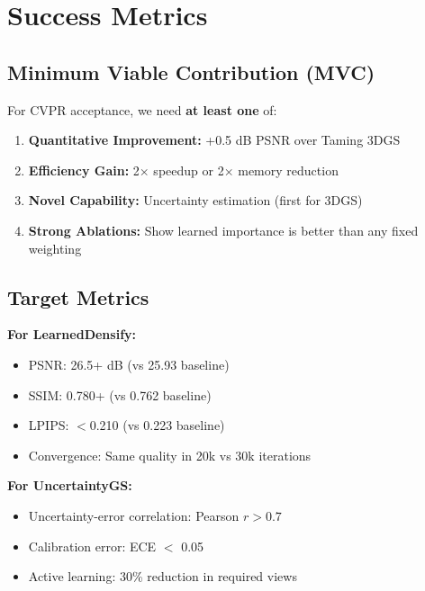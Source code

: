 \documentclass[11pt,letterpaper]{article}
\begin{document}
\section{Success Metrics}

\subsection{Minimum Viable Contribution (MVC)}

For CVPR acceptance, we need \textbf{at least one} of:
\begin{enumerate}[leftmargin=*]
    \item \textbf{Quantitative Improvement:} +0.5 dB PSNR over Taming 3DGS
    \item \textbf{Efficiency Gain:} 2$\times$ speedup or 2$\times$ memory reduction
    \item \textbf{Novel Capability:} Uncertainty estimation (first for 3DGS)
    \item \textbf{Strong Ablations:} Show learned importance is better than any fixed weighting
\end{enumerate}

\subsection{Target Metrics}

\textbf{For LearnedDensify:}
\begin{itemize}[leftmargin=*]
    \item PSNR: 26.5+ dB (vs 25.93 baseline)
    \item SSIM: 0.780+ (vs 0.762 baseline)
    \item LPIPS: $<$0.210 (vs 0.223 baseline)
    \item Convergence: Same quality in 20k vs 30k iterations
\end{itemize}

\textbf{For UncertaintyGS:}
\begin{itemize}[leftmargin=*]
    \item Uncertainty-error correlation: Pearson $r > 0.7$
    \item Calibration error: ECE $<$ 0.05
    \item Active learning: 30\% reduction in required views
\end{itemize}
\end{document}
